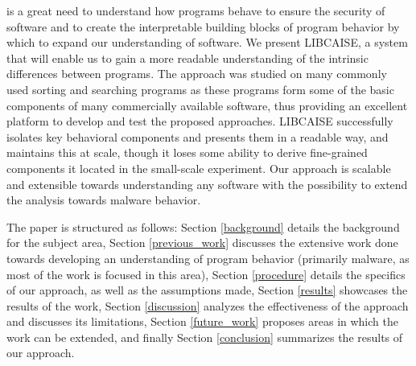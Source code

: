  is a great need to understand how programs behave to ensure the security of software and to create the interpretable building blocks of program behavior by which to expand our understanding of software. We present LIBCAISE, a system that will enable us to gain a more readable understanding of the intrinsic differences between programs. The approach was studied on many commonly used sorting and searching programs as these programs form some of the basic components of many commercially available software, thus providing an excellent platform to develop and test the proposed approaches. LIBCAISE successfully isolates key behavioral components and presents them in a readable way, and maintains this at scale, though it loses some ability to derive fine-grained components it located in the small-scale experiment. Our approach is scalable and extensible towards understanding any software with the possibility to extend the analysis towards malware behavior.

The paper is structured as follows: Section \ref{background} details the background for the subject area, Section \ref{previous_work} discusses the extensive work done towards developing an understanding of program behavior (primarily malware, as most of the work is focused in this area), Section \ref{procedure} details the specifics of our approach, as well as the assumptions made, Section \ref{results} showcases the results of the work, Section \ref{discussion} analyzes the effectiveness of the approach and discusses its limitations, Section \ref{future_work} proposes areas in which the work can be extended, and finally Section \ref{conclusion} summarizes the results of our approach.